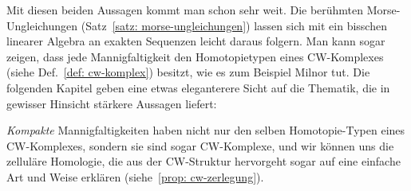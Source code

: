 Mit diesen beiden Aussagen kommt man schon sehr weit. Die berühmten Morse- \\Ungleichungen 
(Satz~\ref{satz: morse-ungleichungen}) lassen
sich mit ein bisschen linearer Algebra an exakten Sequenzen leicht daraus folgern. Man kann sogar
zeigen, dass jede Mannigfaltigkeit den Homotopietypen eines CW-Komplexes 
(siehe Def.~\ref{def: cw-komplex}) besitzt, wie es zum Beispiel Milnor tut. Die folgenden Kapitel 
geben eine etwas eleganterere Sicht auf die Thematik, die in gewisser Hinsicht stärkere Aussagen
liefert:

\textit{Kompakte} Mannigfaltigkeiten haben nicht nur den selben Homotopie-Typen eines CW-Komplexes, 
sondern sie sind sogar CW-Komplexe, und wir können uns die zelluläre Homologie, die aus der 
CW-Struktur hervorgeht sogar auf eine einfache Art und Weise erklären 
(siehe~\ref{prop: cw-zerlegung}).